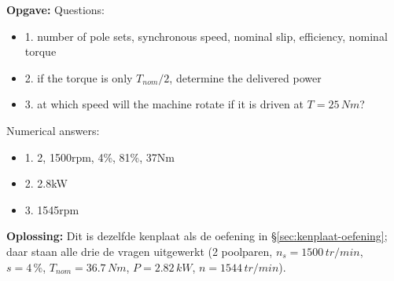 \begin{oefenblok}
    \textbf{Opgave:}
    \newline
    Questions:
    \begin{itemize}
     \item 1.
     number of pole sets, synchronous speed, nominal slip, efficiency, nominal torque
     \item 2. if the torque is only $T_{nom}/2$, determine the delivered power
     \item 3. at which speed will the machine rotate if it is driven at $T=25\,Nm$?
    \end{itemize}
    Numerical answers:
    \begin{itemize}
     \item 1. 2, 1500rpm, 4\%, 81\%, 37Nm
     \item 2. 2.8kW
     \item 3. 1545rpm
    \end{itemize}
    \textbf{Oplossing:}
    \newline
        Dit is dezelfde kenplaat als de oefening in §\ref{sec:kenplaat-oefening}; daar staan
    alle drie de vragen uitgewerkt (2 poolparen, $n_s = 1500\,tr/min$, $s = 4\,\%$,
    $T_{nom} = 36.7\,Nm$, $P = 2.82\,kW$, $n = 1544\,tr/min$).
\end{oefenblok}

